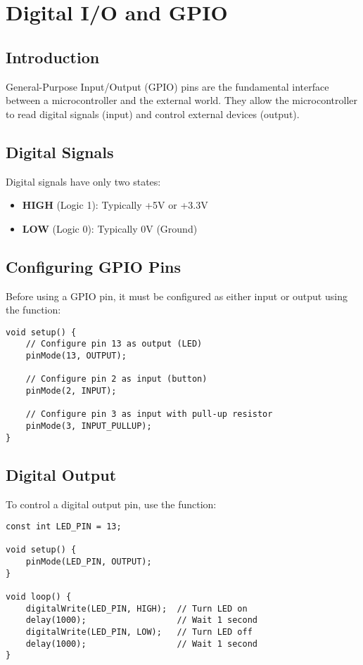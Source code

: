 \chapter{Digital I/O and GPIO}

\section{Introduction}

General-Purpose Input/Output (GPIO) pins are the fundamental interface between a microcontroller and the external world. They allow the microcontroller to read digital signals (input) and control external devices (output).

\section{Digital Signals}

Digital signals have only two states:
\begin{itemize}
    \item \textbf{HIGH} (Logic 1): Typically +5V or +3.3V
    \item \textbf{LOW} (Logic 0): Typically 0V (Ground)
\end{itemize}

\section{Configuring GPIO Pins}

Before using a GPIO pin, it must be configured as either input or output using the  function:

\begin{lstlisting}[caption=Configuring GPIO Pins]
void setup() {
    // Configure pin 13 as output (LED)
    pinMode(13, OUTPUT);
    
    // Configure pin 2 as input (button)
    pinMode(2, INPUT);
    
    // Configure pin 3 as input with pull-up resistor
    pinMode(3, INPUT_PULLUP);
}
\end{lstlisting}

\section{Digital Output}

To control a digital output pin, use the  function:

\begin{lstlisting}[caption=Blinking LED Example]
const int LED_PIN = 13;

void setup() {
    pinMode(LED_PIN, OUTPUT);
}

void loop() {
    digitalWrite(LED_PIN, HIGH);  // Turn LED on
    delay(1000);                  // Wait 1 second
    digitalWrite(LED_PIN, LOW);   // Turn LED off
    delay(1000);                  // Wait 1 second
}
\end{lstlisting}


